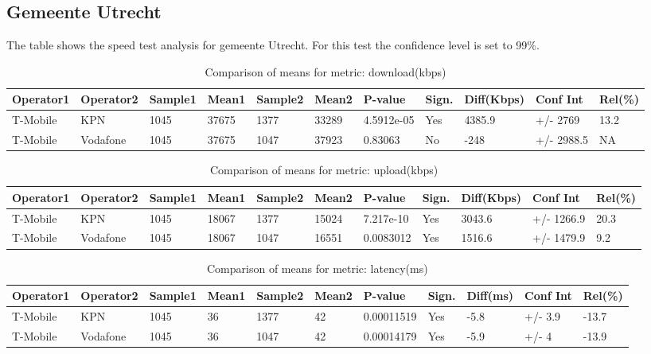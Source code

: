 \documentclass[]{article}
\begin{document}
\normalsize

\newpage

\subsection{Gemeente Utrecht}\label{gemeente-utrecht}

The table shows the speed test analysis for gemeente Utrecht. For this
test the confidence level is set to 99\%.

\begin{table}[ht]
\centering
{\footnotesize
\begin{tabular}{lllllllllll}
  \hline
Operator1 & Operator2 & Sample1 & Mean1 & Sample2 & Mean2 & P-value & Sign. & Diff(Kbps) & Conf Int & Rel(\%) \\ 
  \hline
T-Mobile & KPN & 1045 & 37675 & 1377 & 33289 & 4.5912e-05 & Yes & 4385.9 & +/- 2769 & 13.2 \\ 
  T-Mobile & Vodafone & 1045 & 37675 & 1047 & 37923 & 0.83063 & No & -248 & +/- 2988.5 & NA \\ 
   \hline
\end{tabular}
}
\caption{Comparison of means for metric: download(kbps)} 
\end{table}\begin{table}[ht]
\centering
{\footnotesize
\begin{tabular}{lllllllllll}
  \hline
Operator1 & Operator2 & Sample1 & Mean1 & Sample2 & Mean2 & P-value & Sign. & Diff(Kbps) & Conf Int & Rel(\%) \\ 
  \hline
T-Mobile & KPN & 1045 & 18067 & 1377 & 15024 & 7.217e-10 & Yes & 3043.6 & +/- 1266.9 & 20.3 \\ 
  T-Mobile & Vodafone & 1045 & 18067 & 1047 & 16551 & 0.0083012 & Yes & 1516.6 & +/- 1479.9 & 9.2 \\ 
   \hline
\end{tabular}
}
\caption{Comparison of means for metric: upload(kbps)} 
\end{table}\begin{table}[ht]
\centering
{\footnotesize
\begin{tabular}{lllllllllll}
  \hline
Operator1 & Operator2 & Sample1 & Mean1 & Sample2 & Mean2 & P-value & Sign. & Diff(ms) & Conf Int & Rel(\%) \\ 
  \hline
T-Mobile & KPN & 1045 & 36 & 1377 & 42 & 0.00011519 & Yes & -5.8 & +/- 3.9 & -13.7 \\ 
  T-Mobile & Vodafone & 1045 & 36 & 1047 & 42 & 0.00014179 & Yes & -5.9 & +/- 4 & -13.9 \\ 
   \hline
\end{tabular}
}
\caption{Comparison of means for metric: latency(ms)} 
\end{table}
\end{document}
